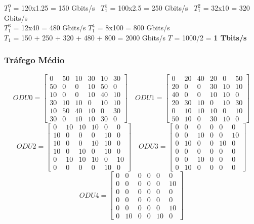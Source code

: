$T_1^0$ = 120x1.25 = 150 Gbits/s \  $T_1^1$ = 100x2.5 = 250 Gbits/s \  $T_1^2$ = 32x10 = 320 Gbits/s \\

$T_1^3$ = 12x40 = 480 Gbits/s \quad
$T_1^4$ = 8x100 = 800 Gbits/s \\

$T_{1}$ = 150 + 250 + 320 + 480 + 800 = 2000 Gbits/s \qquad
$T$ = 1000/2 = \textbf{1 Tbits/s}\\

\subsubsection{Tráfego Médio}
\label{medium}


\[
ODU0=
  \begin{bmatrix}
    0 & 50 & 10 & 30 & 10 & 30 \\
    50 & 0 & 0 & 10 & 50 & 0 \\
    10 & 0 & 0 & 10 & 40 & 10 \\
    30 & 10 & 10 & 0 & 10 & 10 \\
    10 & 50 & 40 & 10 & 0 & 30 \\
    30 & 0 & 10 & 10 & 30 & 0
  \end{bmatrix}
\quad ODU1=
  \begin{bmatrix}
    0 & 20 & 40 & 20 & 0 & 50 \\
    20 & 0 & 0 & 30 & 10 & 10 \\
    40 & 0 & 0 & 10 & 10 & 0 \\
    20 & 30 & 10 & 0 & 10 & 30 \\
    0 & 10 & 10 & 10 & 0 & 10 \\
    50 & 10 & 0 & 30 & 10 & 0
  \end{bmatrix}
\]
\[
ODU2=
  \begin{bmatrix}
    0 & 10 & 10 & 10 & 0 & 0 \\
    10 & 0 & 0 & 0 & 10 & 0 \\
    10 & 0 & 0 & 10 & 10 & 0 \\
    10 & 0 & 10 & 0 & 10 & 0 \\
    0 & 10 & 10 & 10 & 0 & 10 \\
    0 & 0 & 0 & 0 & 10 & 0
  \end{bmatrix}
\quad ODU3=
  \begin{bmatrix}
    0 & 0 & 0 & 0 & 0 & 0 \\
    0 & 0 & 10 & 0 & 0 & 10 \\
    0 & 10 & 0 & 0 & 10 & 0 \\
    0 & 0 & 0 & 0 & 0 & 0 \\
    0 & 0 & 10 & 0 & 0 & 0 \\
    0 & 10 & 0 & 0 & 0 & 0
  \end{bmatrix}
\]
\[
ODU4=
  \begin{bmatrix}
    0 & 0 & 0 & 0 & 0 & 0 \\
    0 & 0 & 0 & 0 & 0 & 10 \\
    0 & 0 & 0 & 0 & 0 & 0 \\
    0 & 0 & 0 & 0 & 0 & 0 \\
    0 & 0 & 0 & 0 & 0 & 10 \\
    0 & 10 & 0 & 0 & 10 & 0
  \end{bmatrix}
\]


